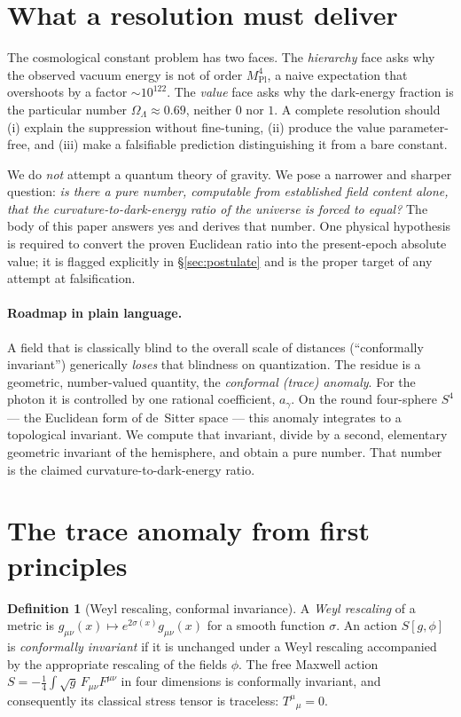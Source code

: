 \documentclass[11pt,a4paper]{article}
\theoremstyle{definition}
\newtheorem{definition}{Definition}
\theoremstyle{remark}
\newcommand{\ag}{a_\gamma}
\newcommand{\OL}{\Omega_\Lambda}
\newcommand{\Mpl}{M_{\mathrm{Pl}}}
\begin{document}
\tableofcontents

\section{What a resolution must deliver}\label{sec:problem}
The cosmological constant problem has two faces. The \emph{hierarchy} face asks why the observed
vacuum energy is not of order $\Mpl^4$, a naive expectation that overshoots by a factor
$\sim10^{122}$. The \emph{value} face asks why the dark-energy fraction is the particular number
$\OL\approx0.69$, neither $0$ nor $1$. A complete resolution should (i) explain the suppression
without fine-tuning, (ii) produce the value parameter-free, and (iii) make a falsifiable
prediction distinguishing it from a bare constant.

We do \emph{not} attempt a quantum theory of gravity. We pose a narrower and sharper question:
\emph{is there a pure number, computable from established field content alone, that the
curvature-to-dark-energy ratio of the universe is forced to equal?} The body of this paper answers
yes and derives that number. One physical hypothesis is required to convert the proven Euclidean
ratio into the present-epoch absolute value; it is flagged explicitly in \S\ref{sec:postulate} and
is the proper target of any attempt at falsification.

\paragraph{Roadmap in plain language.} A field that is classically blind to the overall scale of
distances (``conformally invariant'') generically \emph{loses} that blindness on quantization. The
residue is a geometric, number-valued quantity, the \emph{conformal (trace) anomaly}. For the
photon it is controlled by one rational coefficient, $\ag$. On the round four-sphere $S^4$ --- the
Euclidean form of de~Sitter space --- this anomaly integrates to a topological invariant. We
compute that invariant, divide by a second, elementary geometric invariant of the hemisphere, and
obtain a pure number. That number is the claimed curvature-to-dark-energy ratio.

\section{The trace anomaly from first principles}\label{sec:anomaly}
\begin{definition}[Weyl rescaling, conformal invariance]
A \emph{Weyl rescaling} of a metric is $g_{\mu\nu}(x)\mapsto e^{2\sigma(x)}g_{\mu\nu}(x)$ for a
smooth function $\sigma$. An action $S[g,\phi]$ is \emph{conformally invariant} if it is unchanged
under a Weyl rescaling accompanied by the appropriate rescaling of the fields $\phi$. The free
Maxwell action $S=-\tfrac14\int\sqrt g\,F_{\mu\nu}F^{\mu\nu}$ in four dimensions is conformally
invariant, and consequently its classical stress tensor is traceless: $T^\mu{}_\mu=0$.
\end{definition}
\end{document}
